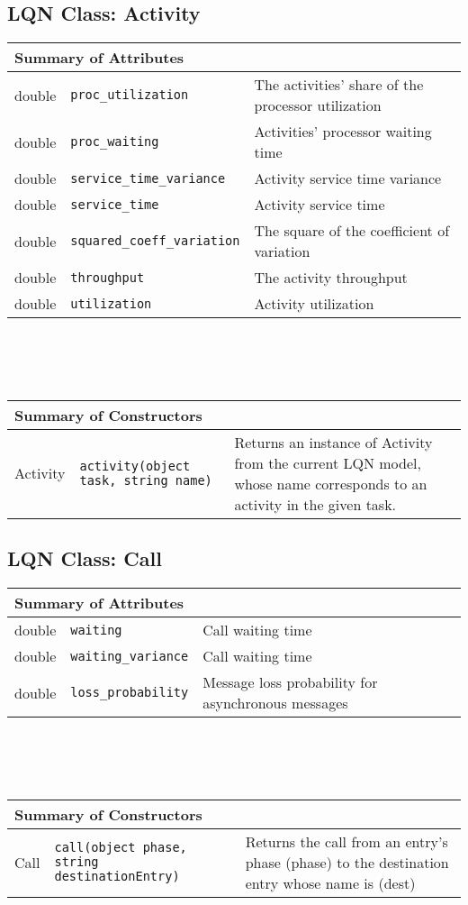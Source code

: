 \subsection{LQN Class: Activity}
\begin{tabular}{|p{1.0in}|p{2.3in}||p{2.8in}|}
  \hline
  \multicolumn{3}{|l|}{\textbf{Summary of Attributes}}\\
  \hline
  double & {\tt proc\_utilization} & The activities' share of the processor utilization\\
  double & {\tt proc\_waiting} & Activities' processor waiting time\\
  double & {\tt service\_time\_variance} & Activity service time variance\\
  double & {\tt service\_time} & Activity service time\\
  double & {\tt squared\_coeff\_variation} & The square of the coefficient of variation\\
  double & {\tt throughput} & The activity throughput\\
  double & {\tt utilization} & Activity utilization\\
  \hline
\end{tabular}
\\\\\ \\
\begin{tabular}{|p{1.0in}|p{2.3in}||p{2.8in}|}
  \hline
  \multicolumn{3}{|l|}{\textbf{Summary of Constructors}}\\
  \hline
  Activity & {\tt activity(object task, string name)} & Returns an instance of Activity from the current LQN model, whose name corresponds to an activity in the given task.\\
  \hline
\end{tabular}

\subsection{LQN Class: Call}
\begin{tabular}{|p{1.0in}|p{2.3in}||p{2.8in}|}
  \hline
  \multicolumn{3}{|l|}{\textbf{Summary of Attributes}}\\
  \hline
  double & {\tt waiting} & Call waiting time\\
  double & {\tt waiting\_variance} & Call waiting time\\
  double & {\tt loss\_probability} & Message loss probability for asynchronous messages\\
  \hline
\end{tabular}
\\\\\ \\
\begin{tabular}{|p{1.0in}|p{2.3in}||p{2.8in}|}
  \hline
  \multicolumn{3}{|l|}{\textbf{Summary of Constructors}}\\
  \hline
  Call & {\tt call(object phase, string destinationEntry)} & Returns the call from an entry's phase (phase) to the destination entry whose name is (dest)\\
  \hline
\end{tabular}


